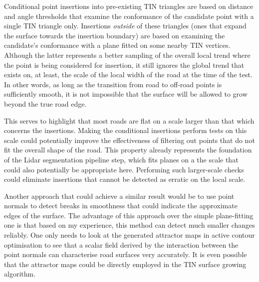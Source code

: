 Conditional point insertions into pre-existing TIN triangles are based on distance and angle thresholds that examine the conformance of the candidate point with a single TIN triangle only. Insertions \textit{outside} of these triangles (ones that expand the surface towards the insertion boundary) are based on examining the candidate's conformance with a plane fitted on some nearby TIN vertices. Although the latter represents a better sampling of the overall local trend where the point is being considered for insertion, it still ignores the global trend that exists on, at least, the scale of the local width of the road at the time of the test. In other words, as long as the transition from road to off-road points is sufficiently smooth, it is not impossible that the surface will be allowed to grow beyond the true road edge.

This serves to highlight that most roads are flat on a scale larger than that which concerns the insertions. Making the conditional insertions perform tests on this scale could potentially improve the effectiveness of filtering out points that do not fit the overall shape of the road. This property already represents the foundation of the Lidar segmentation pipeline step, which fits planes on a the scale that could also potentially be appropriate here. Performing such larger-scale checks could eliminate insertions that cannot be detected as erratic on the local scale.

Another approach that could achieve a similar result would be to use point normals to detect breaks in smoothness that could indicate the approximate edges of the surface. The advantage of this approach over the simple plane-fitting one is that based on my experience, this method can detect much smaller changes reliably. One only needs to look at the generated attractor maps in active contour optimisation to see that a scalar field derived by the interaction between the point normals can characterise road surfaces very accurately. It is even possible that the attractor maps could be directly employed in the TIN surface growing algorithm.

